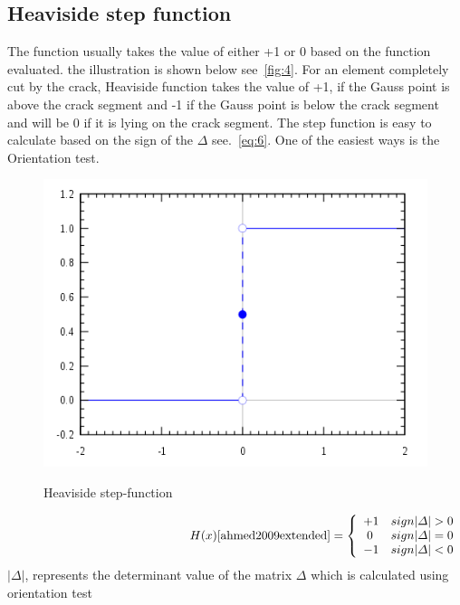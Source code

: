 \documentclass[fleqn, 12.5pt,a4paper]{report}
\newcommand\tab[1][1cm]{\hspace*{#1}}
\begin{document}
\subsection{Heaviside step function}
The function usually takes the value of either +1 or 0 based on the function evaluated. the illustration is shown below see~\autoref{fig:4}. For an element completely cut by the crack, Heaviside function takes the value of +1, if the Gauss point is above the crack segment and -1 if the Gauss point is below the crack segment and will be 0 if it is lying on the crack segment. The step function is easy to calculate based on the sign of the $\Delta$ see.~\autoref{eq:6}. One of the easiest ways is the Orientation test\cite{ahmed2009extended}.\\

\begin{figure}[h]
    \centering
    \includegraphics[scale =0.5]{Hside.png}
    \caption{Heaviside step-function} \cite{ahmed2009extended}
    \label{fig:4}
\end{figure}


\begin{align}\label{eq:6}
\hspace{5.25cm}H(x)\cite{ahmed2009extended} = 
\left\{
\begin{array}{ll}
+1 & sign| \Delta | > 0\\
\tab[0.1cm] 0 & sign| \Delta | = 0\\
-1 & sign| \Delta | < 0\\
\end{array}
\right.
\end{align}
$| \Delta |$, represents the determinant value of the matrix $\Delta$ which is calculated using orientation test
\end{document}
